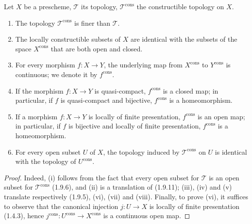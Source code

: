 \begin{proposition}[1.9.14]
\label{IV.1.9.14}
Let $X$ be a prescheme, $\mathscr T$ its topology,
$\mathscr T^{\mathrm{cons}}$ the constructible topology on $X$.
\begin{enumerate}
  \item[(i)] The topology $\mathscr T^{\mathrm{cons}}$ is finer than
  $\mathscr T$.
  \item[(ii)] The locally constructible subsets of $X$ are identical
  with the subsets of the space $X^{\mathrm{cons}}$ that are both open and
  closed.
  \item[(iii)] For every morphism $f:X\to Y$, the underlying map from
  $X^{\mathrm{cons}}$ to $Y^{\mathrm{cons}}$ is continuous; we denote it by
  $f^{\mathrm{cons}}$.
  \item[(iv)] If the morphism $f:X\to Y$ is quasi-compact,
  $f^{\mathrm{cons}}$ is a closed map; in particular, if $f$
  is quasi-compact and bijective, $f^{\mathrm{cons}}$ is a homeomorphism.
  \item[(v)] If a morphism $f:X\to Y$ is locally of finite
  presentation, $f^{\mathrm{cons}}$ is an open map; in particular,
  if $f$ is bijective and locally of finite presentation,
  $f^{\mathrm{cons}}$ is a homeomorphism.
  \item[(vi)] For every open subset $U$ of $X$, the topology induced by
  $\mathscr T^{\mathrm{cons}}$ on $U$ is identical with the topology of
  $U^{\mathrm{cons}}$.
\end{enumerate}
\end{proposition}

\begin{proof}
Indeed, (i) follows from the fact that every open subset for $\mathscr T$ is
an open subset for $\mathscr T^{\mathrm{cons}}$ (1.9.6), and (ii) is a
translation of (1.9.11); (iii), (iv) and (v) translate respectively
(1.9.5), (vi), (vii) and (viii). Finally, to prove (vi), it suffices to
observe that the canonical injection $j:U\to X$ is locally of finite
presentation (1.4.3), hence
$j^{\mathrm{cons}}:U^{\mathrm{cons}}\to X^{\mathrm{cons}}$ is a
continuous open map.
\end{proof}

